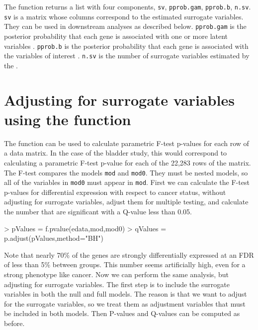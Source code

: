 \documentclass[12pt]{article}
\begin{document}
The  function returns a list with four components, \texttt{sv}, \texttt{pprob.gam}, \texttt{pprob.b}, \texttt{n.sv}. \texttt{sv} is a matrix whose columns correspond to the estimated surrogate variables. They can be used in downstream analyses as described below. \texttt{pprob.gam} is the posterior probability that each gene is associated with one or more latent variables \cite{leek:2008aa}.  \texttt{pprob.b} is the posterior probability that each gene is associated with the variables of interest \cite{leek:2008aa}.  \texttt{n.sv} is the number of surrogate variables estimated by the . 

\section{Adjusting for surrogate variables using the  function}

The  function can be used to calculate parametric F-test p-values for each row of a data matrix. In the case of the bladder study, this would correspond to calculating a parametric F-test p-value for each of the 22,283 rows of the matrix. The F-test compares the models \texttt{mod} and \texttt{mod0}. They must be nested models, so all of the variables in \texttt{mod0} must appear in \texttt{mod}. First we can calculate the F-test p-values for differential expression with respect to cancer status, without adjusting for surrogate variables, adjust them for multiple testing, and calculate the number that are significant with a Q-value less than 0.05. 

\begin{Schunk}
\begin{Sinput}
> pValues = f.pvalue(edata,mod,mod0)
> qValues = p.adjust(pValues,method="BH")
\end{Sinput}
\end{Schunk}

Note that nearly 70\% of the genes are strongly differentially expressed at an FDR of less than 5\% between groups. This number seems artificially high, even for a strong phenotype like cancer. Now we can perform the same analysis, but adjusting for surrogate variables. The first step is to include the surrogate variables in both the null and full models. The reason is that we want to adjust for the surrogate variables, so we treat them as adjustment variables that must be included in both models. Then P-values and Q-values can be computed as before. 
\end{document}
